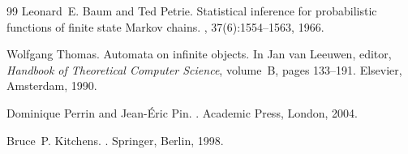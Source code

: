 \begin{thebibliography}{99}
Leonard~E. Baum and Ted Petrie.
\newblock Statistical inference for probabilistic functions of finite state
  {M}arkov chains.
, 37(6):1554--1563, 1966.

Wolfgang Thomas.
\newblock Automata on infinite objects.
\newblock In Jan van Leeuwen, editor, {\em Handbook of Theoretical Computer
  Science}, volume~B, pages 133--191. Elsevier, Amsterdam, 1990.

Dominique Perrin and Jean-{\'E}ric Pin.
.
\newblock Academic Press, London, 2004.

Bruce~P. Kitchens.
.
\newblock Springer, Berlin, 1998.

\end{thebibliography}

